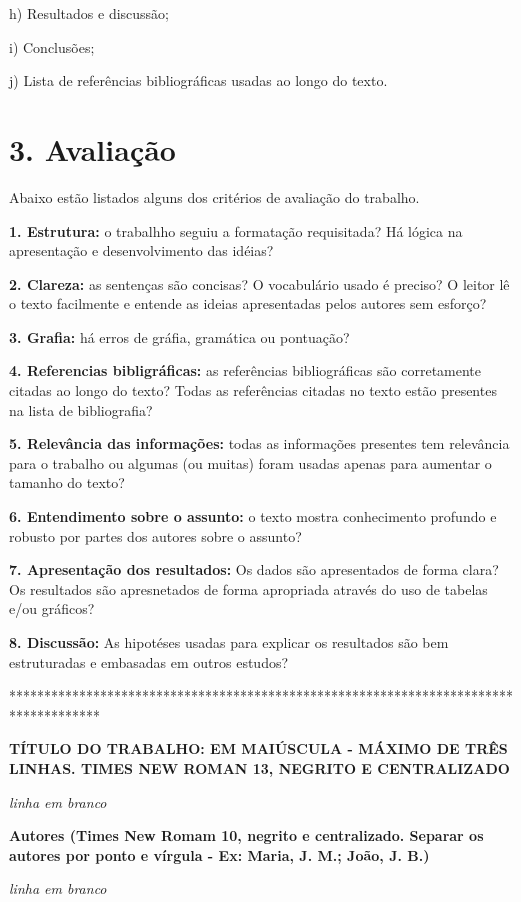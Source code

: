 \documentclass[a4paper,10pt]{article}
\begin{document}
    h) Resultados e discussão;

    i) Conclusões;

    j) Lista de referências bibliográficas usadas ao longo do texto.

   \section* {3. Avaliação}
   \noindent

    Abaixo estão listados alguns dos critérios de avaliação do trabalho.

    \textbf{1. Estrutura:} o trabalhho seguiu a formatação requisitada? Há lógica na apresentação e desenvolvimento das idéias?

    \textbf{2. Clareza:} as sentenças são concisas? O vocabulário usado é preciso? O leitor lê o texto facilmente e entende as ideias apresentadas pelos autores sem esforço?

    \textbf{3. Grafia:} há erros de gráfia, gramática ou pontuação?

    \textbf{4. Referencias bibligráficas:} as referências bibliográficas são corretamente citadas ao longo do texto? Todas as referências citadas no texto estão presentes na lista de bibliografia?

    \textbf{5. Relevância das informações:} todas as informações presentes tem relevância para o trabalho ou algumas (ou muitas) foram usadas apenas para aumentar o tamanho do texto?

    \textbf{6. Entendimento sobre o assunto:} o texto mostra conhecimento profundo e robusto por partes dos autores sobre o assunto?

    \textbf{7. Apresentação dos resultados:} Os dados são apresentados de forma clara? Os resultados são apresnetados de forma apropriada através do uso de tabelas e/ou gráficos?

    \textbf{8. Discussão:} As hipotéses usadas para explicar os resultados são bem estruturadas e embasadas em outros estudos?

\vspace{10ex}

*************************************************************************************

  {\centering
  \textbf{TÍTULO DO TRABALHO: EM MAIÚSCULA - MÁXIMO DE TRÊS LINHAS. TIMES NEW ROMAN 13, NEGRITO E  CENTRALIZADO}

  \textit{linha em branco}

  \textbf{Autores (Times New Romam 10, negrito e centralizado. Separar os autores por ponto e vírgula - Ex: Maria, J. M.; João, J. B.)}

  \textit{linha em branco}

  \par
  }
\end{document}
